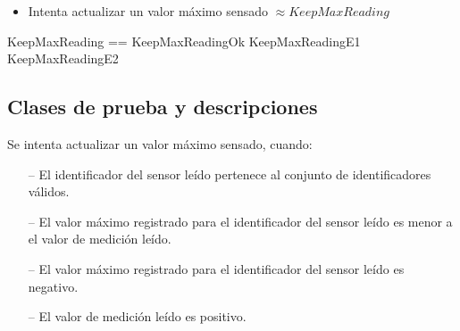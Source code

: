 
\begin{itemize}
  \item Intenta actualizar un valor máximo sensado $\approx KeepMaxReading$
\end{itemize}

\begin{zed}
KeepMaxReading == KeepMaxReadingOk \lor KeepMaxReadingE1 \lor KeepMaxReadingE2
\end{zed}

\subsection*{Clases de prueba y descripciones}


\begin{tcolorbox}[colback=gray!5!white,colframe=gray!50!black,
  colbacktitle=gray!75!black,title=KeepMaxReading\_SP\_3]
  Se intenta actualizar un valor máximo sensado, cuando:
     \begin{itemize}
  	    \item[--]{El identificador del sensor leído pertenece al conjunto de identificadores válidos.}
  	    \item[--]{El valor máximo registrado para el identificador del sensor leído es menor a el valor de medición leído.}
	      \item[--]{El valor máximo registrado para el identificador del sensor leído es negativo.}
	      \item[--]{El valor de medición leído es positivo.}
     \end{itemize}
\end{tcolorbox}


